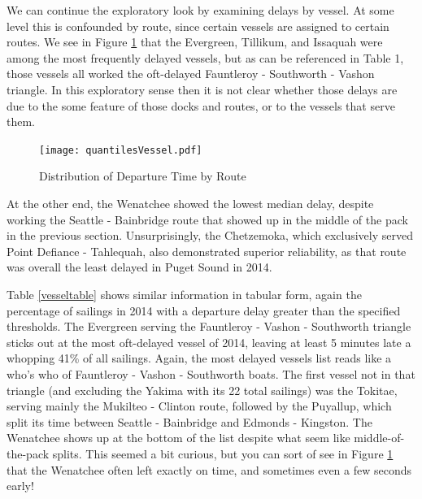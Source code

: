 \documentclass[11pt, letterpaper]{article}
\begin{document}
We can continue the exploratory look by examining delays by vessel. At some level this is confounded by route, since certain vessels are assigned to certain routes. We see in Figure \ref{vessel1} that the Evergreen, Tillikum, and Issaquah were among the most frequently delayed vessels, but as can be referenced in Table 1, those vessels all worked the oft-delayed Fauntleroy - Southworth - Vashon triangle. In this exploratory sense then it is not clear whether those delays are due to the some feature of those docks and routes, or to the vessels that serve them. 

\begin{figure}[htbp]
\begin{center}
\texttt{[image: quantilesVessel.pdf]}
\caption{Distribution of Departure Time by Route}
\label{vessel1}
\end{center}
\end{figure}

At the other end, the Wenatchee showed the lowest median delay, despite working the Seattle - Bainbridge route that showed up in the middle of the pack in the previous section. Unsurprisingly, the Chetzemoka, which exclusively served Point Defiance - Tahlequah, also demonstrated superior reliability, as that route was overall the least delayed in Puget Sound in 2014.

Table \ref{vesseltable} shows similar information in tabular form, again the percentage of sailings in 2014 with a departure delay greater than the specified thresholds.  The Evergreen serving the Fauntleroy - Vashon - Southworth triangle sticks out at the most oft-delayed vessel of 2014, leaving at least 5 minutes late a whopping 41\% of all sailings. Again, the most delayed vessels list reads like a who's who of Fauntleroy - Vashon - Southworth boats. The first vessel not in that triangle (and excluding the Yakima with its 22 total sailings) was the Tokitae, serving mainly the Mukilteo - Clinton route, followed by the Puyallup, which split its time between Seattle - Bainbridge and Edmonds - Kingston. The Wenatchee shows up at the bottom of the list despite what seem like middle-of-the-pack splits. This seemed a bit curious, but you can sort of see in Figure \ref{vessel1} that the Wenatchee often left exactly on time, and sometimes even a few seconds early!
\end{document}
